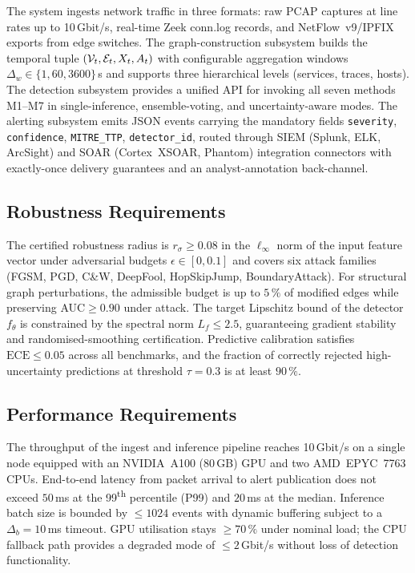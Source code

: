 The system ingests network traffic in three formats: raw PCAP captures at line rates up to 10\,Gbit/s, real-time Zeek conn.log records, and NetFlow~v9/IPFIX exports from edge switches. The graph-construction subsystem builds the temporal tuple $(\mathcal{V}_t,\mathcal{E}_t,X_t,A_t)$ with configurable aggregation windows $\Delta_w\in\{1,60,3600\}$\,s and supports three hierarchical levels (services, traces, hosts). The detection subsystem provides a unified API for invoking all seven methods M1--M7 in single-inference, ensemble-voting, and uncertainty-aware modes. The alerting subsystem emits JSON events carrying the mandatory fields \texttt{severity}, \texttt{confidence}, \texttt{MITRE\_TTP}, \texttt{detector\_id}, routed through SIEM (Splunk, ELK, ArcSight) and SOAR (Cortex~XSOAR, Phantom) integration connectors with exactly-once delivery guarantees and an analyst-annotation back-channel.

\subsection{Robustness Requirements}
\label{subsec:req_robustness}

The certified robustness radius is $r_\sigma\geq 0.08$ in the $\ell_\infty$ norm of the input feature vector under adversarial budgets $\epsilon\in[0,0.1]$ and covers six attack families (FGSM, PGD, C\&W, DeepFool, HopSkipJump, BoundaryAttack). For structural graph perturbations, the admissible budget is up to $5\,\%$ of modified edges while preserving AUC$\geq 0.90$ under attack. The target Lipschitz bound of the detector $f_\theta$ is constrained by the spectral norm $L_f\leq 2.5$, guaranteeing gradient stability and randomised-smoothing certification. Predictive calibration satisfies $\mathrm{ECE}\leq 0.05$ across all benchmarks, and the fraction of correctly rejected high-uncertainty predictions at threshold $\tau=0.3$ is at least $90\,\%$.

\subsection{Performance Requirements}
\label{subsec:req_performance}

The throughput of the ingest and inference pipeline reaches 10\,Gbit/s on a single node equipped with an NVIDIA~A100 (80\,GB) GPU and two AMD~EPYC~7763 CPUs. End-to-end latency from packet arrival to alert publication does not exceed $50\,$ms at the 99\textsuperscript{th} percentile (P99) and $20\,$ms at the median. Inference batch size is bounded by $\leq 1024$ events with dynamic buffering subject to a $\Delta_b=10\,$ms timeout. GPU utilisation stays $\geq 70\,\%$ under nominal load; the CPU fallback path provides a degraded mode of $\leq 2\,$Gbit/s without loss of detection functionality.


